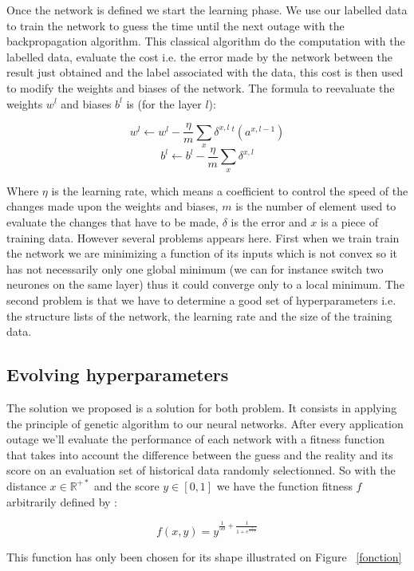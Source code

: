 \documentclass[10pt,a4paper,oneside]{article}
\begin{document}
\begin{multicols}{2}
Once the network is defined we start the learning phase. We use our labelled data to train the network to guess the time until the next outage with the backpropagation algorithm. This classical algorithm do the computation with the labelled data, evaluate the cost i.e. the error made by the network between the result just obtained and the label associated with the data, this cost is then used to modify the weights and biases of the network.
The formula to reevaluate the weights $w^l$ and biases $b^l$ is (for the layer $l$):

\vspace{0.8cm}

\begin{Large}
\[ w^l \leftarrow  w^l-\frac{\eta}{m} \sum_x \delta^{x,l} \,{}^t(a^{x,l-1}) \]
\[ b^l \leftarrow b^l-\frac{\eta}{m} \sum_x \delta^{x,l} \]
\end{Large}

\vspace{0.8cm}

Where $\eta$ is the learning rate, which means a coefficient to control the speed of the changes made upon the weights and biases, $m$ is the number of element used to evaluate the changes that have to be made, $\delta$ is the error and $x$ is a piece of training data.
However several problems appears here. First when we train train the network we are minimizing a function of its inputs which is not convex so it has not necessarily only one global minimum (we can for instance switch two neurones on the same layer) thus it could converge only to a local minimum.
The second problem is that we have to determine a good set of hyperparameters i.e. the structure lists of the network, the learning rate and the size of the training data.

\subsection{Evolving hyperparameters}
The solution we proposed is a solution for both problem. It consists in applying the principle of genetic algorithm to our neural networks. After every application outage we'll evaluate the performance of each network with a fitness function that takes into account the difference between the guess and the reality and its score on an evaluation set of historical data randomly selectionned. So with the distance $x\in\mathbb{R}^{+*}$ and the score $y\in[0, 1]$ we have the function fitness $f$ arbitrarily defined by :

\vspace{0.8cm}

\begin{Large}
\[ f(x, y) = y^{\frac{1}{50}+\frac{1}{1+e^{\frac{1}{1+x}}}} \]
\end{Large}

\vspace{0.8cm}

This function has only been chosen for its shape illustrated on Figure ~\ref{fonction}

\end{multicols}
\end{document}
